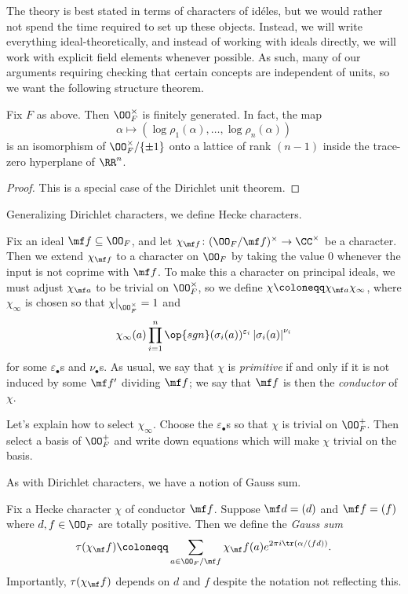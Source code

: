 \documentclass{article}
\begin{document}
The theory is best stated in terms of characters of id\'eles, but we would rather not spend the time required to set up these objects. Instead, we will write everything ideal-theoretically, and instead of working with ideals directly, we will work with explicit field elements whenever possible. As such, many of our arguments requiring checking that certain concepts are independent of units, so we want the following structure theorem.
\begin{theorem}
	Fix $F$ as above. Then $\OO_F^\times$ is finitely generated. In fact, the map
	\[\alpha\mapsto\left(\log\rho_1(\alpha),\ldots,\log\rho_n(\alpha)\right)\]
	is an isomorphism of $\OO_F^\times/\{\pm1\}$ onto a lattice of rank $(n-1)$ inside the trace-zero hyperplane of $\RR^n$.
\end{theorem}
\begin{proof}
	This is a special case of the Dirichlet unit theorem.
\end{proof}
Generalizing Dirichlet characters, we define Hecke characters.
\begin{definition}
	Fix an ideal $\mf f\subseteq\OO_F$, and let $\chi_{\mf f}\colon(\OO_F/\mf f)^\times\to\CC^\times$ be a character. Then we extend $\chi_{\mf f}$ to a character on $\OO_F$ by taking the value $0$ whenever the input is not coprime with $\mf f$. To make this a character on principal ideals, we must adjust $\chi_{\mf a}$ to be trivial on $\OO_F^\times$, so we define $\chi\coloneqq\chi_{\mf a}\chi_\infty$, where $\chi_\infty$ is chosen so that $\chi|_{\OO_F^\times}=1$ and
	\[\chi_\infty(a)\prod_{i=1}^n\op{sgn}(\sigma_i(a))^{\varepsilon_i}\left|\sigma_i(a)\right|^{\nu_i}\]
	for some $\varepsilon_\bullet$s and $\nu_\bullet$s. As usual, we say that $\chi$ is \textit{primitive} if and only if it is not induced by some $\mf f'$ dividing $\mf f$; we say that $\mf f$ is then the \textit{conductor} of $\chi$.
\end{definition}
\begin{remark}
	Let's explain how to select $\chi_\infty$. Choose the $\varepsilon_\bullet$s so that $\chi$ is trivial on $\OO_F^+$. Then select a basis of $\OO_F^+$ and write down equations which will make $\chi$ trivial on the basis.
\end{remark}
As with Dirichlet characters, we have a notion of Gauss sum.
\begin{definition}
	Fix a Hecke character $\chi$ of conductor $\mf f$. Suppose $\mf d=(d)$ and $\mf f=(f)$ where $d,f\in\OO_F$ are totally positive. Then we define the \textit{Gauss sum}
	\[\tau(\chi_\mf f)\coloneqq\sum_{a\in\OO_F/\mf f}\chi_\mf f(a)e^{2\pi i\tr(\alpha/(fd))}.\]
	Importantly, $\tau(\chi_\mf f)$ depends on $d$ and $f$ despite the notation not reflecting this.
\end{definition}
\end{document}
